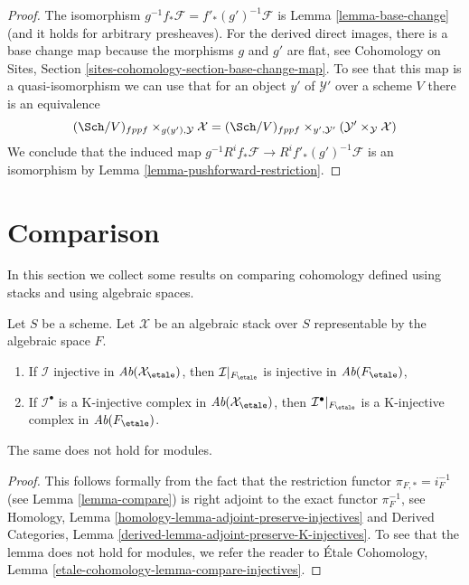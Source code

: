 \begin{proof}
The isomorphism $g^{-1}f_*\mathcal{F} = f'_*(g')^{-1}\mathcal{F}$ is
Lemma \ref{lemma-base-change} (and it holds for arbitrary presheaves).
For the derived direct images, there is a base change map because the
morphisms $g$ and $g'$ are flat, see
Cohomology on Sites, Section \ref{sites-cohomology-section-base-change-map}.
To see that this map is a quasi-isomorphism we can use that for
an object $y'$ of $\mathcal{Y}'$ over a scheme $V$ there is an equivalence
$$
(\Sch/V)_{fppf} \times_{g(y'), \mathcal{Y}} \mathcal{X}
=
(\Sch/V)_{fppf} \times_{y', \mathcal{Y}'}
(\mathcal{Y}' \times_\mathcal{Y} \mathcal{X})
$$
We conclude that the induced map
$g^{-1}R^if_*\mathcal{F} \to R^if'_*(g')^{-1}\mathcal{F}$
is an isomorphism by
Lemma \ref{lemma-pushforward-restriction}.
\end{proof}












\section{Comparison}
\label{section-compare}

\noindent
In this section we collect some results on comparing cohomology defined
using stacks and using algebraic spaces.

\begin{lemma}
\label{lemma-compare-injectives}
Let $S$ be a scheme. Let $\mathcal{X}$ be an algebraic stack over $S$
representable by the algebraic space $F$.
\begin{enumerate}
\item If $\mathcal{I}$ injective in $\textit{Ab}(\mathcal{X}_\etale)$, then
$\mathcal{I}|_{F_\etale}$ is injective in $\textit{Ab}(F_\etale)$,
\item If $\mathcal{I}^\bullet$ is a K-injective complex in
$\textit{Ab}(\mathcal{X}_\etale)$, then $\mathcal{I}^\bullet|_{F_\etale}$
is a K-injective complex in $\textit{Ab}(F_\etale)$.
\end{enumerate}
The same does not hold for modules.
\end{lemma}

\begin{proof}
This follows formally from the fact that the restriction functor
$\pi_{F, *} = i_F^{-1}$ (see Lemma \ref{lemma-compare})
is right adjoint to the exact functor $\pi_F^{-1}$, see
Homology, Lemma \ref{homology-lemma-adjoint-preserve-injectives} and
Derived Categories, Lemma \ref{derived-lemma-adjoint-preserve-K-injectives}.
To see that the lemma does not hold for modules, we refer the
reader to \'Etale Cohomology, Lemma
\ref{etale-cohomology-lemma-compare-injectives}.
\end{proof}

